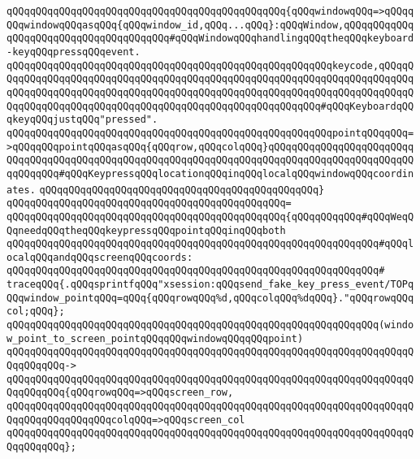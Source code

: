 \verb|qQQqqQQqqQQqqQQqqQQqqQQqqQQqqQQqqQQqqQQqqQQqqQQq{qQQqwindowqQQq=>qQQqqQQqwindowqQQqasqQQq{qQQqwindow_id,qQQq...qQQq}:qQQqWindow,qQQqqQQqqQQqqQQqqQQqqQQqqQQqqQQqqQQqqQQq#qQQqWindowqQQqhandlingqQQqtheqQQqkeyboard-keyqQQqpressqQQqevent.|\newline
\verb|qQQqqQQqqQQqqQQqqQQqqQQqqQQqqQQqqQQqqQQqqQQqqQQqqQQqqQQqkeycode,qQQqqQQqqQQqqQQqqQQqqQQqqQQqqQQqqQQqqQQqqQQqqQQqqQQqqQQqqQQqqQQqqQQqqQQqqQQqqQQqqQQqqQQqqQQqqQQqqQQqqQQqqQQqqQQqqQQqqQQqqQQqqQQqqQQqqQQqqQQqqQQqqQQqqQQqqQQqqQQqqQQqqQQqqQQqqQQqqQQqqQQqqQQqqQQqqQQqqQQq#qQQqKeyboardqQQqkeyqQQqjustqQQq"pressed".|\newline
\verb|qQQqqQQqqQQqqQQqqQQqqQQqqQQqqQQqqQQqqQQqqQQqqQQqqQQqqQQqpointqQQqqQQq=>qQQqqQQqpointqQQqasqQQq{qQQqrow,qQQqcolqQQq}qQQqqQQqqQQqqQQqqQQqqQQqqQQqqQQqqQQqqQQqqQQqqQQqqQQqqQQqqQQqqQQqqQQqqQQqqQQqqQQqqQQqqQQqqQQqqQQqqQQqqQQq#qQQqKeypressqQQqlocationqQQqinqQQqlocalqQQqwindowqQQqcoordinates.|\newline
\verb|qQQqqQQqqQQqqQQqqQQqqQQqqQQqqQQqqQQqqQQqqQQqqQQq}|\newline
\verb|qQQqqQQqqQQqqQQqqQQqqQQqqQQqqQQqqQQqqQQqqQQqqQQq=|\newline
\verb|qQQqqQQqqQQqqQQqqQQqqQQqqQQqqQQqqQQqqQQqqQQqqQQq{qQQqqQQqqQQq#qQQqWeqQQqneedqQQqtheqQQqkeypressqQQqpointqQQqinqQQqboth|\newline
\verb|qQQqqQQqqQQqqQQqqQQqqQQqqQQqqQQqqQQqqQQqqQQqqQQqqQQqqQQqqQQqqQQq#qQQqlocalqQQqandqQQqscreenqQQqcoords:|\newline
\verb|qQQqqQQqqQQqqQQqqQQqqQQqqQQqqQQqqQQqqQQqqQQqqQQqqQQqqQQqqQQqqQQq#|\newline
\verb|traceqQQq{.qQQqsprintfqQQq"xsession:qQQqsend_fake_key_press_event/TOPqQQqwindow_pointqQQq=qQQq{qQQqrowqQQq%d,qQQqcolqQQq%dqQQq}."qQQqrowqQQqcol;qQQq};|\newline
\verb|qQQqqQQqqQQqqQQqqQQqqQQqqQQqqQQqqQQqqQQqqQQqqQQqqQQqqQQqqQQqqQQq(window_point_to_screen_pointqQQqqQQqwindowqQQqqQQqpoint)|\newline
\verb|qQQqqQQqqQQqqQQqqQQqqQQqqQQqqQQqqQQqqQQqqQQqqQQqqQQqqQQqqQQqqQQqqQQqqQQqqQQqqQQq->|\newline
\verb|qQQqqQQqqQQqqQQqqQQqqQQqqQQqqQQqqQQqqQQqqQQqqQQqqQQqqQQqqQQqqQQqqQQqqQQqqQQqqQQq{qQQqrowqQQq=>qQQqscreen_row,|\newline
\verb|qQQqqQQqqQQqqQQqqQQqqQQqqQQqqQQqqQQqqQQqqQQqqQQqqQQqqQQqqQQqqQQqqQQqqQQqqQQqqQQqqQQqqQQqcolqQQq=>qQQqscreen_col|\newline
\verb|qQQqqQQqqQQqqQQqqQQqqQQqqQQqqQQqqQQqqQQqqQQqqQQqqQQqqQQqqQQqqQQqqQQqqQQqqQQqqQQq};|\newline
